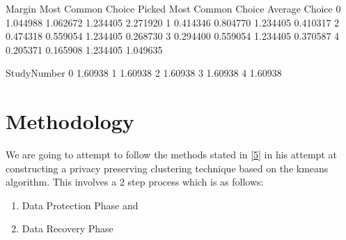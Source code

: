 \documentclass[letterpaper,10pt,english]{jupyterBook}
\begin{document}
\begin{sphinxVerbatim}[commandchars=\\\{\}]
\end{sphinxVerbatim}

\begin{sphinxVerbatim}[commandchars=\\\{\}]
     Margin  Most Common Choice Picked  Most Common Choice  Average Choice  \PYGZbs{}
0  1.044988                   1.062672            1.234405        2.271920   
1 \PYGZhy{}0.414346                  \PYGZhy{}0.804770            1.234405       \PYGZhy{}0.410317   
2 \PYGZhy{}0.474318                  \PYGZhy{}0.559054            1.234405        0.268730   
3 \PYGZhy{}0.294400                  \PYGZhy{}0.559054            1.234405        0.370587   
4  0.205371                  \PYGZhy{}0.165908            1.234405        1.049635   

   StudyNumber  
0     \PYGZhy{}1.60938  
1     \PYGZhy{}1.60938  
2     \PYGZhy{}1.60938  
3     \PYGZhy{}1.60938  
4     \PYGZhy{}1.60938  
\end{sphinxVerbatim}


\section{Methodology}
\label{\detokenize{k-means_variation:methodology}}
\sphinxAtStartPar
We are going to attempt to follow the methods stated in {[}\hyperlink{cite.zbibliography:id6}{5}{]} in his attempt at constructing a privacy preserving clustering technique based on the k\sphinxhyphen{}means algorithm. This involves a 2 step process which is as follows:
\begin{enumerate}
%
\item {} 
\sphinxAtStartPar
Data Protection Phase and

\item {} 
\sphinxAtStartPar
Data Recovery Phase

\end{enumerate}
\end{document}

